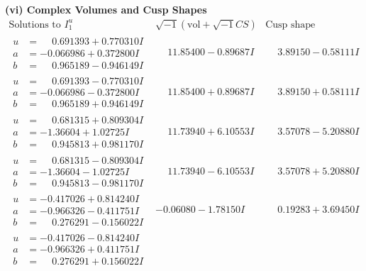 \documentclass[1p]{elsarticle_modified}
\theoremstyle{definition}
\newcommand{\I}{\sqrt{-1}}
\begin{document}
\newpage\flushleft \textbf{(vi) Complex Volumes and Cusp Shapes}
$$\begin{array}{c|c|c}  
\text{Solutions to }I^u_{1}& \I (\text{vol} + \sqrt{-1}CS) & \text{Cusp shape}\\
 \hline 
\begin{aligned}
u &= \phantom{-}0.691393 + 0.770310 I \\
a &= -0.066986 + 0.372800 I \\
b &= \phantom{-}0.965189 - 0.946149 I\end{aligned}
 & \phantom{-}11.85400 - 0.89687 I & \phantom{-}3.89150 - 0.58111 I \\ \hline\begin{aligned}
u &= \phantom{-}0.691393 - 0.770310 I \\
a &= -0.066986 - 0.372800 I \\
b &= \phantom{-}0.965189 + 0.946149 I\end{aligned}
 & \phantom{-}11.85400 + 0.89687 I & \phantom{-}3.89150 + 0.58111 I \\ \hline\begin{aligned}
u &= \phantom{-}0.681315 + 0.809304 I \\
a &= -1.36604 + 1.02725 I \\
b &= \phantom{-}0.945813 + 0.981170 I\end{aligned}
 & \phantom{-}11.73940 + 6.10553 I & \phantom{-}3.57078 - 5.20880 I \\ \hline\begin{aligned}
u &= \phantom{-}0.681315 - 0.809304 I \\
a &= -1.36604 - 1.02725 I \\
b &= \phantom{-}0.945813 - 0.981170 I\end{aligned}
 & \phantom{-}11.73940 - 6.10553 I & \phantom{-}3.57078 + 5.20880 I \\ \hline\begin{aligned}
u &= -0.417026 + 0.814240 I \\
a &= -0.966326 - 0.411751 I \\
b &= \phantom{-}0.276291 - 0.156022 I\end{aligned}
 & -0.06080 - 1.78150 I & \phantom{-}0.19283 + 3.69450 I \\ \hline\begin{aligned}
u &= -0.417026 - 0.814240 I \\
a &= -0.966326 + 0.411751 I \\
b &= \phantom{-}0.276291 + 0.156022 I\end{aligned}

\end{array}$$
\end{document}
